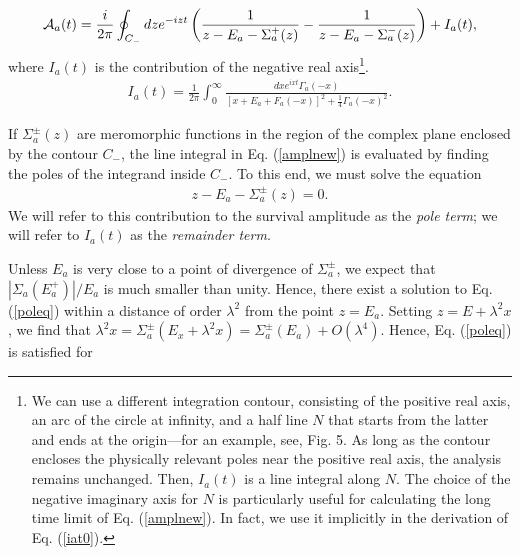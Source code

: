 \documentclass[12pt]{article}
\numberwithin{equation}{section}
\begin{document}
 \begin{eqnarray}
{\cal A}_a(t) = \frac{i}{2 \pi } \oint_{C_-} dz e^{-izt} \left(\frac{1}{z-E_a - \Sigma^+_a(z)} -  \frac{1}{z-E_a - \Sigma^-_a(z)}  \right)+  I_a(t),  \label{amplnew}
\end{eqnarray}
where $I_a(t)$ is the contribution of the negative real axis\footnote{We can use a different integration contour, consisting of the positive real axis, an arc of the circle at infinity, and a half line $N$ that starts from the latter and ends at the origin---for an example, see, Fig. 5. As long as the contour encloses the physically relevant poles near the positive real axis, the analysis remains unchanged. Then, $I_a(t)$ is a line integral along $N$.
The choice   of the negative imaginary axis for $N$ is particularly useful for calculating the long time limit of Eq. (\ref{amplnew}). In fact, we use it implicitly in the derivation of Eq. (\ref{iat0}).}.
\begin{eqnarray}
I_a(t) = \frac{1}{2\pi }\int_0^{\infty} \frac{dx e^{ixt} \Gamma_a(-x)}{[x+  E_a  +F_a(-x)]^2 + \frac{1}{4}\Gamma_a(-x)^2}. \label{remainder}
\end{eqnarray}


 If $\Sigma^{\pm}_a(z)$ are meromorphic functions in the region of the complex plane enclosed by the contour $C_-$, the line integral in Eq. (\ref{amplnew}) is evaluated by finding the poles of the integrand inside $C_-$. To this end, we must  solve the equation
\begin{eqnarray}
z-E_a - \Sigma_a^{\pm}(z) = 0. \label{poleq}
\end{eqnarray}
We will refer to this contribution to the survival amplitude as the {\em pole term}; we will refer to $I_a(t)$ as the {\em remainder term}.


\medskip

   Unless $E_a$ is very close to a point of divergence of $\Sigma_a^{\pm} $, we expect that $|\Sigma_a(E_a^+)|/ E_a$  is  much smaller than unity. Hence, there  exist a solution to Eq. (\ref{poleq}) within a distance of order $\lambda^2$ from the point $z = E_a$.  Setting $z = E + \lambda^2 x$, we find that $ \lambda ^2 x = \Sigma^{\pm}_a(E_x + \lambda^2x) = \Sigma_a^{\pm} (E_a) + O(\lambda^4)$. Hence, Eq. (\ref{poleq}) is satisfied for
\end{document}
